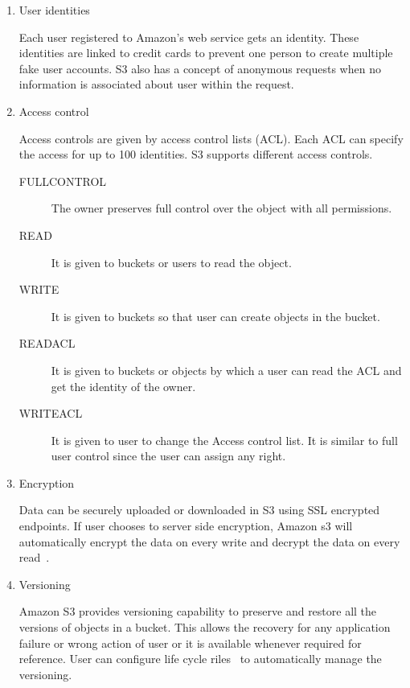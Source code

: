 \begin{enumerate}

\item User identities

Each user registered to Amazon’s web service gets an identity. These identities
are linked to credit cards to prevent one person to create multiple fake user
accounts. S3 also has a concept of anonymous requests when no information is
associated about user within the request.

\item Access control

Access controls are given by access control lists (ACL). Each ACL can specify
the access for up to 100 identities. S3 supports different access controls. 
\begin{description}
\item [FULLCONTROL] The owner preserves full control over the object with all
permissions.
\item [READ] It is given to buckets or users to read the object. 
\item [WRITE] It is given to buckets so that user can create objects in the
bucket.
\item [READACL] It is given to buckets or objects by which a user can read the
ACL and get the identity of the owner.
\item [WRITEACL] It is given to user to change the Access control list. It is
similar to full
user control since the user can assign any right.
\end{description}

\item Encryption

Data can be securely uploaded or downloaded in S3 using SSL encrypted
endpoints. If user chooses to server side encryption, Amazon s3 will
automatically encrypt
the data on every write and decrypt the data on every
read~\cite{hid-sp18-420-amazon-S3-data-encryption}.

\item Versioning

Amazon S3 provides versioning capability to preserve and restore all the
versions of objects in a bucket. This allows the recovery for any application
failure or wrong action of user or it is available whenever required for
reference. User can configure life cycle
riles~\cite{hid-sp18-420-amazon-S3-lidecycle-rule} to automatically manage the
versioning.

\end{enumerate}

